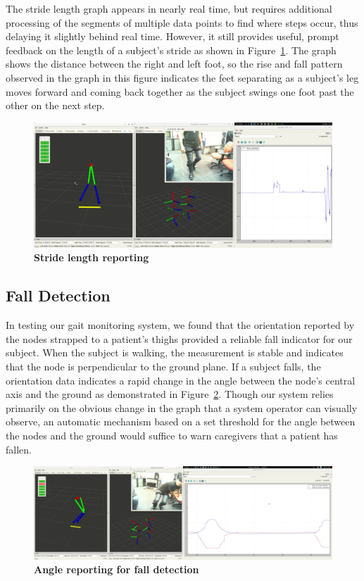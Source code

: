 \documentclass[conference]{IEEEtran}
\begin{document}
The stride length graph appears in nearly real time, but requires additional processing
of the segments of multiple data points to find where steps occur, thus delaying it
slightly behind real time. However, it still provides useful, prompt feedback on the
length of a subject's stride as shown in Figure~\ref{fig:length}. The graph shows the
distance between the right and left foot, so the rise and fall pattern observed in the
graph in this figure indicates the feet separating as a subject's leg moves forward and coming
back together as the subject swings one foot past the other on the next step. 

\begin{figure}[h]
  \centering
  \includegraphics[width=0.95\columnwidth]{figs/length}
  \caption{{\bf Stride length reporting}}
  \label{fig:length}
\end{figure}

\subsection{Fall Detection}
In testing our gait monitoring system, we found that the orientation reported by the nodes
strapped to a patient's thighs provided a reliable fall indicator for our subject. When
the subject is walking, the measurement is stable and indicates that the node is
perpendicular to the ground plane. If a subject falls, the orientation data indicates a
rapid change in the angle between the node's central axis and the ground as demonstrated
in Figure~\ref{fig:falling}. Though our system relies primarily on the obvious change in
the graph that a system operator can visually observe, an automatic mechanism based on a
set threshold for the angle between the nodes and the ground would suffice to warn
caregivers that a patient has fallen. 

\begin{figure}[h]
  \centering
  \includegraphics[width=.99\columnwidth]{figs/falling}
  \caption{{\bf Angle reporting for fall detection }}
  \label{fig:falling}
\end{figure}
\end{document}
